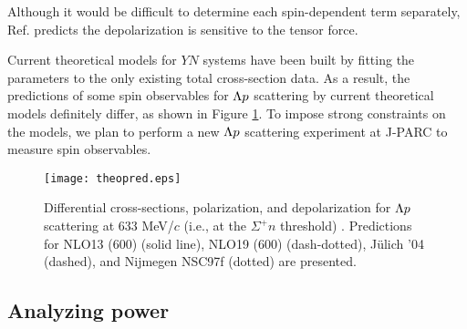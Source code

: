 Although it would be difficult to determine each spin-dependent term separately, Ref. \cite{chiEFT-1992} predicts the depolarization is sensitive to the tensor force. 

Current theoretical models for $YN$ systems have been built by fitting the parameters to the only existing total cross-section data. As a result, the predictions of some spin observables for $\Lambda p$ scattering by current theoretical models definitely differ, as shown in Figure \ref{fig-theopred}. To impose strong constraints on the models, we plan to perform a new $\Lambda p$ scattering experiment at J-PARC to measure spin observables.

\begin{figure}[h!]
 \begin{center}
   \texttt{[image: theopred.eps]}
   \caption{Differential cross-sections, polarization, and depolarization for $\Lambda p$ scattering at 633 MeV/$c$ (i.e., at the $\Sigma^{+}n$ threshold) \cite{chiEFT-2021}. Predictions for NLO13 (600) (solid line), NLO19 (600) (dash-dotted), J\"{u}lich '04 (dashed), and Nijmegen NSC97f (dotted) are presented.}
   \label{fig-theopred}
 \end{center}
\end{figure}


\subsection{Analyzing power}
\label{sec-anapow}

